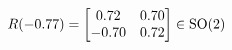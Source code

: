 \documentclass[preview]{standalone}
\begin{document}
\begin{align*}
\special{dvisvgm:raw <g id='unique000'>}R(-0.77) = \begin{bmatrix} 0.72 & 0.70 \\ -0.70 & 0.72 \end{bmatrix} \in \text{SO}(2)\special{dvisvgm:raw </g>}
\end{align*}
\end{document}

